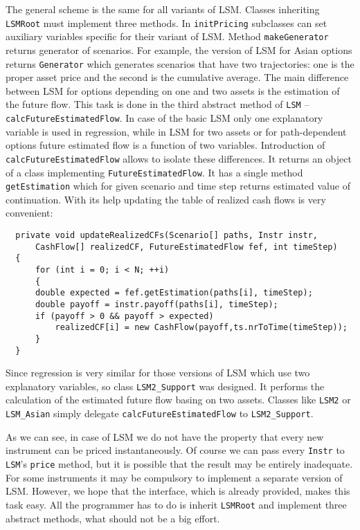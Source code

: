 \documentclass[a4paper,11pt, twoside]{book}
\theoremstyle{definition}
\theoremstyle{remark}
\newcounter{example}[chapter]
\begin{document}
The general scheme is the same for all variants of LSM. Classes inheriting \texttt{LSMRoot} must implement three methods. In \texttt{initPricing} subclasses can set auxiliary variables specific for their variant of LSM. Method \texttt{makeGenerator} returns generator of scenarios. For example, the version of LSM for Asian options returns \texttt{Generator} which generates scenarios that have two trajectories: one is the proper asset price and the second is the cumulative average. The main difference between LSM for options depending on one and two assets is the estimation of the future flow. This task is done in the third abstract method of \texttt{LSM} -- \texttt{calcFutureEstimatedFlow}. In case of the basic LSM only one explanatory variable is used in regression, while in LSM for two assets or for path-dependent options future estimated flow is a function of two variables. Introduction of \texttt{calcFutureEstimatedFlow} allows to isolate these differences. It returns an object of a class implementing \texttt{FutureEstimatedFlow}. It has a single method \texttt{getEstimation} which for given scenario and time step returns estimated value of continuation. With its help updating the table of realized cash flows is very convenient:
\begin{lstlisting}
  private void updateRealizedCFs(Scenario[] paths, Instr instr,
      CashFlow[] realizedCF, FutureEstimatedFlow fef, int timeStep)
  {
      for (int i = 0; i < N; ++i)
      {
	  double expected = fef.getEstimation(paths[i], timeStep);
	  double payoff = instr.payoff(paths[i], timeStep);
	  if (payoff > 0 && payoff > expected)
	      realizedCF[i] = new CashFlow(payoff,ts.nrToTime(timeStep));
      }
  }
\end{lstlisting}

Since regression is very similar for those versions of LSM which use two explanatory variables, so class \texttt{LSM2\_Support} was designed. It performs the calculation of the estimated future flow basing on two assets. Classes like \texttt{LSM2} or \texttt{LSM\_Asian} simply delegate \texttt{calcFutureEstimatedFlow} to \texttt{LSM2\_Support}.
   
As we can see, in case of LSM we do not have the property that every new instrument can be priced instantaneously. Of course we can pass every \texttt{Instr} to \texttt{LSM}'s \texttt{price} method, but it is possible that the result may be entirely inadequate. For some instruments it may be compulsory to implement a separate version of LSM. However, we hope that the interface, which is already provided, makes this task easy. All the programmer has to do is inherit \texttt{LSMRoot} and implement three abstract methods, what should not be a big effort.
\end{document}
